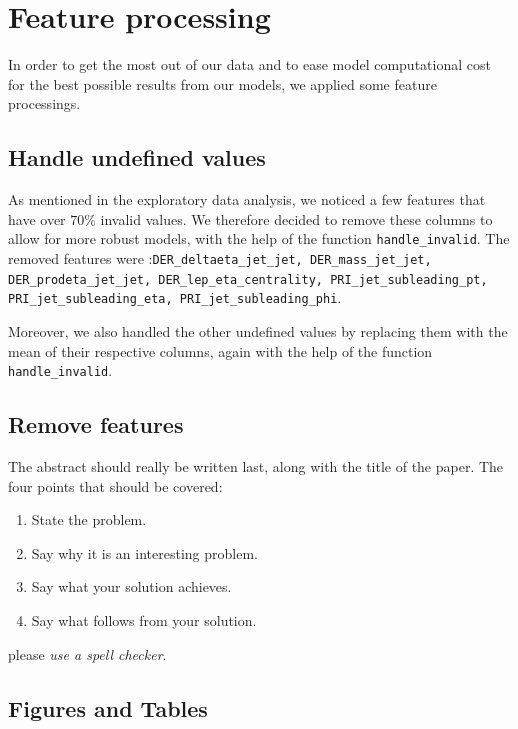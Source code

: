 \documentclass[10pt,conference,compsocconf]{IEEEtran}
\begin{document}
\section{Feature processing}
In order to get the most out of our data and to ease model computational cost for the best possible results from our models, we applied some feature processings.

\subsection{Handle undefined values}
As mentioned in the exploratory data analysis, we noticed a few features that have over $70\%$ invalid values. We therefore decided to remove these columns to allow for more robust models, with the help of the function \texttt{handle\_invalid}. The removed features were :\texttt{DER\_deltaeta\_jet\_jet, DER\_mass\_jet\_jet, DER\_prodeta\_jet\_jet, DER\_lep\_eta\_centrality, PRI\_jet\_subleading\_pt, PRI\_jet\_subleading\_eta, PRI\_jet\_subleading\_phi}.

Moreover, we also handled the other undefined values by replacing them with the mean of their respective columns, again with the help of the function \texttt{handle\_invalid}.

\subsection{Remove features}
The abstract should really be written last, along with the title of
the paper. The four points that should be covered:
\begin{enumerate}
\item State the problem.
\item Say why it is an interesting problem.
\item Say what your solution achieves.
\item Say what follows from your solution.
\end{enumerate}

please \emph{use a
  spell checker}.

\subsection{Figures and Tables}
\end{document}
